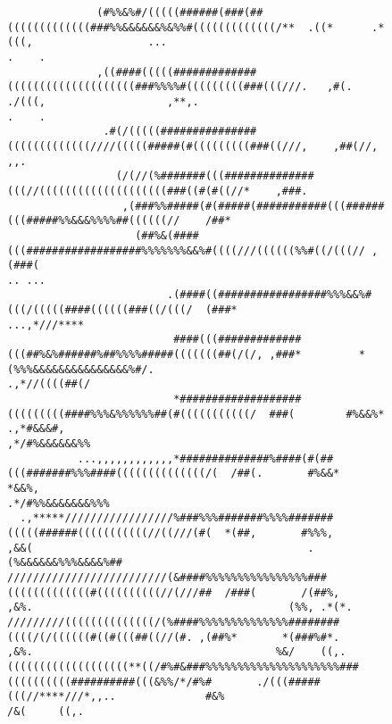 \documentclass[a4paper, 20pt,fleqn]{article}
\begin{document}
\begin{figure}
\begin{verbatim}
              (#%%&%#/(((((######(###(##(((((((((((((###%%&&&&&&%&%%#(((((((((((((/**  .((*      .*(((,                  ...                                                                   .    .
              ,((####(((((#############((((((((((((((((((((###%%%%#(((((((((###(((///.   ,#(. ./(((,                   ,**,.                                                                   .    .
               .#(/(((((###############(((((((((((((////(((((#####(#(((((((((###((///,    ,##(//,                       ,,.                                                                          
                 (/(//(%#######(((##############(((//((((((((((((((((((((###((#(#((//*    ,###.                                                                                                      
                  ,(###%%#####(#(#####(###########(((######(((#####%%&&&%%%%##((((((//    /##*                                                                                                       
                    (##%&(####(((##################%%%%%%%&&%#((((///((((((%%#((/(((// ,(###(                                                                                                  .. ...
                         .(####((#################%%%&&%#(((/(((((####((((((###((/(((/  (###*                                                                                            ...,*///****
                          ####(((#############(((##%&%######%##%%%%#####(((((((##(/(/, ,###*         *(%%%&&&&&&&&&&&&&&&%#/.                                                           .,*//((((##(/
                          *###################(((((((((####%%%&%%%%%%##(#(((((((((((/  ###(        #%&&%*                .,*#&&&#,                                                      ,*/#%&&&&&&%%
           ...,,,,,,,,,,,,*##############%####(#(##(((#######%%%####((((((((((((((/(  /##(.       #%&&*                         *&&%,                                                .*/#%%&&&&&&&%%%
  .,*****/////////////////%###%%%#######%%%%#######(((((######(((((((((((//((///(#(  *(##,       #%%%,                             ,&&(                                           .(%&&&&&&%%%&&&&%##
/////////////////////////(&####%%%%%%%%%%%%%%%%###(((((((((((((#((((((((((//(///##  /###(       /(##%,                               ,&%.                                        (%%, .*(*.          
/////////((((((((((((((/(%####%%%%%%%%%%%%%%########((((/(/((((((#((#(((##((//(#. ,(##%*       *(###%#*.                              ,&%.                                      %&/    ((,.          
(((((((((((((((((((**((/#%#&###%%%%%%%%%%%%%%%%%%%%%###((((((((((##########(((&%%/*/#%#       ./(((#####(((//****///*,,..              #&%                                     /&(     ((,.          

\end{verbatim}
\end{figure}
\end{document}
